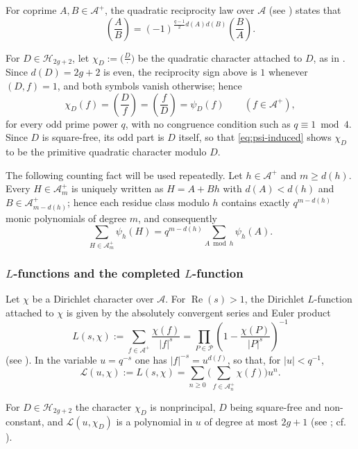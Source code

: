 \documentclass[a4paper,reqno]{amsart}
\numberwithin{equation}{section}
\theoremstyle{remark}
\theoremstyle{definition}
\newcommand{\A}{\mathcal{A}}
\begin{document}
For coprime $A,B\in\A^+$, the quadratic reciprocity law over $\A$
(see \cite[Chapter~3]{Ro02}) states that
$$
\left(\frac{A}{B}\right)
=
(-1)^{\frac{q-1}{2}d(A)d(B)}
\left(\frac{B}{A}\right).
$$

For $D\in\mathcal H_{2g+2}$, let $\chi_D:=\bigl(\frac{D}{\cdot}\bigr)$ be the
quadratic character attached to $D$, as in \cite{Fl17-1,Ju20,AM-21}. Since
$d(D)=2g+2$ is even, the reciprocity sign above is $1$ whenever $(D,f)=1$,
and both symbols vanish otherwise; hence
\begin{equation}\label{eq:reciprocity-even}
\chi_D(f)=\left(\frac{D}{f}\right)=\left(\frac{f}{D}\right)=\psi_D(f)
\qquad(f\in\A^+),
\end{equation}
for every odd prime power $q$, with no congruence condition such as
$q\equiv1\bmod4$.
Since $D$ is square-free, its odd part is $D$ itself, so that
\eqref{eq:psi-induced} shows $\chi_D$ to be the primitive quadratic
character modulo $D$.

The following counting fact will be used repeatedly. Let $h\in\A^+$ and $m\ge d(h)$. Every $H\in\A_m^+$ is
uniquely written as $H=A+Bh$ with $d(A)<d(h)$ and $B\in\A_{m-d(h)}^+$;
hence each residue class modulo $h$ contains exactly $q^{m-d(h)}$ monic
polynomials of degree $m$, and consequently
\begin{equation}\label{eq:full-period}
\sum_{H\in\A_m^+}\psi_h(H)
=
q^{m-d(h)}\sum_{A\bmod h}\psi_h(A).
\end{equation}

\subsubsection*{$L$-functions and the completed $L$-function}
Let $\chi$ be a Dirichlet character over $\A$. For
$\operatorname{Re}(s)>1$, the Dirichlet $L$-function attached to $\chi$ is
given by the absolutely convergent series and Euler product
$$
L(s,\chi)
:=
\sum_{f\in\A^+}\frac{\chi(f)}{|f|^s}
=
\prod_{P\in\mathcal P}
\left(1-\frac{\chi(P)}{|P|^{s}}\right)^{-1}
$$
(see \cite[Chapter~4]{Ro02}). In the variable $u=q^{-s}$ one has
$|f|^{-s}=u^{d(f)}$, so that, for $|u|<q^{-1}$,
$$
\mathcal L(u,\chi)
:=
L(s,\chi)
=
\sum_{n\ge0}
\Biggl(
\sum_{f\in\A_n^+}\chi(f)
\Biggr)u^n.
$$

For $D\in\mathcal H_{2g+2}$ the character $\chi_D$ is nonprincipal, $D$
being square-free and non-constant, and $\mathcal L(u,\chi_D)$ is a
polynomial in $u$ of degree at most $2g+1$ (see
\cite[Proposition~4.3]{Ro02}; cf. \cite[Section~2]{Ju20}).
\end{document}
